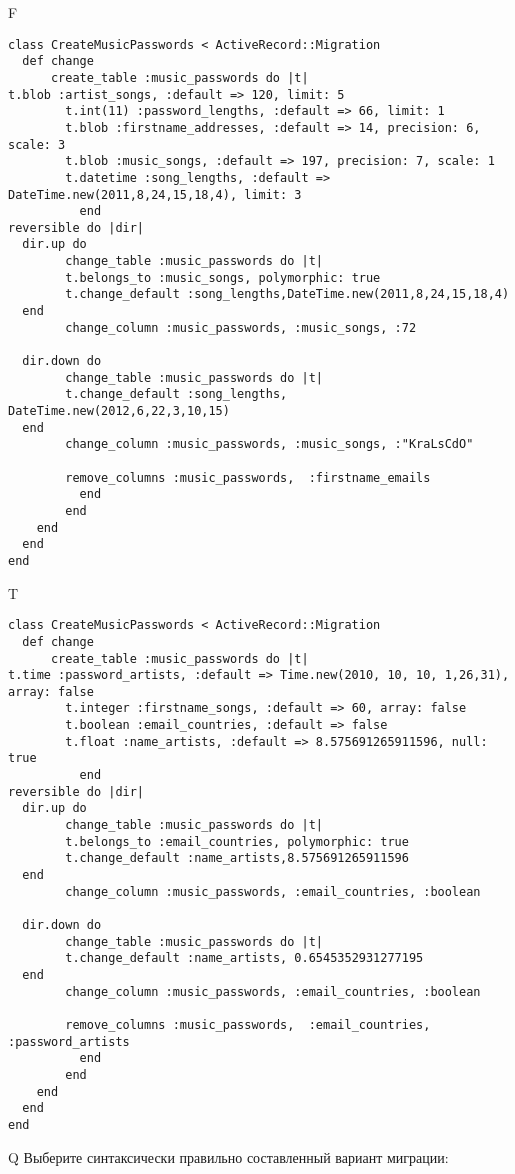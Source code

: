 F
\begin{verbatim}
class CreateMusicPasswords < ActiveRecord::Migration
  def change
	  create_table :music_passwords do |t|
t.blob :artist_songs, :default => 120, limit: 5
		t.int(11) :password_lengths, :default => 66, limit: 1
		t.blob :firstname_addresses, :default => 14, precision: 6, scale: 3
		t.blob :music_songs, :default => 197, precision: 7, scale: 1
		t.datetime :song_lengths, :default => DateTime.new(2011,8,24,15,18,4), limit: 3
		  end
reversible do |dir|
  dir.up do
		change_table :music_passwords do |t|
		t.belongs_to :music_songs, polymorphic: true
 		t.change_default :song_lengths,DateTime.new(2011,8,24,15,18,4)
  end
 		change_column :music_passwords, :music_songs, :72
   
  dir.down do
		change_table :music_passwords do |t|
		t.change_default :song_lengths, DateTime.new(2012,6,22,3,10,15)
  end
 		change_column :music_passwords, :music_songs, :"KraLsCdO"
   
		remove_columns :music_passwords,  :firstname_emails 
	      end
	    end
    end 
  end
end

\end{verbatim}

T
\begin{verbatim}
class CreateMusicPasswords < ActiveRecord::Migration
  def change
	  create_table :music_passwords do |t|
t.time :password_artists, :default => Time.new(2010, 10, 10, 1,26,31), array: false
		t.integer :firstname_songs, :default => 60, array: false
		t.boolean :email_countries, :default => false
		t.float :name_artists, :default => 8.575691265911596, null: true
		  end
reversible do |dir|
  dir.up do
		change_table :music_passwords do |t|
		t.belongs_to :email_countries, polymorphic: true
 		t.change_default :name_artists,8.575691265911596
  end
 		change_column :music_passwords, :email_countries, :boolean
   
  dir.down do
		change_table :music_passwords do |t|
		t.change_default :name_artists, 0.6545352931277195
  end
 		change_column :music_passwords, :email_countries, :boolean
   
		remove_columns :music_passwords,  :email_countries, :password_artists 
	      end
	    end
    end 
  end
end

\end{verbatim}

Q
Выберите синтаксически правильно составленный вариант миграции:

